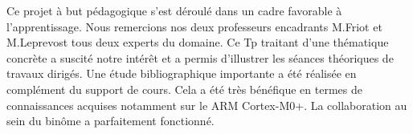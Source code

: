 \documentclass[a4paper]{article}
\begin{document}
Ce projet à but pédagogique s'est déroulé dans un cadre favorable à l'apprentissage. Nous remercions nos  deux professeurs encadrants M.Friot et M.Leprevost tous deux experts du domaine. Ce Tp traitant d’une thématique concrète a suscité notre intérêt et a permis d'illustrer les séances théoriques de travaux dirigés. Une étude bibliographique importante a été réalisée en complément du support de cours. Cela a été très bénéfique en termes de connaissances acquises notamment sur le ARM Cortex-M0+. La collaboration au sein du binôme a parfaitement fonctionné.


  	
  \newpage
	{}
	

	
\end{document}
